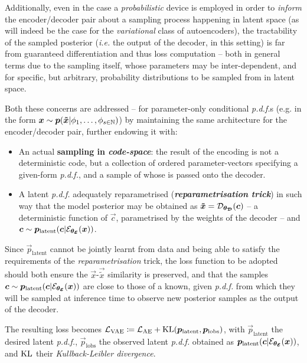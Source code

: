 Additionally, even in the case a \textit{probabilistic} device is employed in order to \textit{inform} the encoder/decoder pair about a sampling process happening in latent space (as will indeed be the case for the \textit{variational} class of autoencoders), the tractability of the sampled posterior (\textit{i.e.} the output of the decoder, in this setting) is far from guaranteed \wrt differentiation and thus loss computation -- both in general terms due to the sampling itself, whose parameters may be inter-dependent, and for specific, but arbitrary, probability distributions to be sampled from in latent space.

Both these concerns are addressed -- for parameter-only conditional \textit{p.d.f.}s (e.g. in the form $\bm{x} \sim \bm{p}(\bm{\tilde{x}} | \phi_1, \dots, \phi_{s\in\mathbb{N}})$) by maintaining the same architecture for the encoder/decoder pair, further endowing it with:
\begin{itemize}
    \item An actual \textbf{sampling in \textit{code-space}}: the result of the encoding is not a deterministic code, but a collection of ordered parameter-vectors specifying a given-form \textit{p.d.f.}, and a sample of whose is passed onto the decoder.
    \item A latent \textit{p.d.f.} adequately reparametrised (\textbf{\textit{reparametrisation trick}}) in such way that the model posterior may be obtained as $\bm{\tilde{x}} = \mathcal{D}_{\bm{\theta_{\mathcal{D}}}}(\bm{c})$ -- a deterministic function of $\vec{c}$, parametrised by the weights of the decoder -- and $\bm{c} \sim \bm{p}_{\text{latent}}(\bm{c}| \mathcal{E}_{\bm{\theta_{\mathcal{E}}}}(\bm{x}))$.
\end{itemize}

Since $\vec{p}_{\text{latent}}$ cannot be jointly learnt from data and being able to satisfy the requirements of the \textit{reparametrisation} trick, the loss function to be adopted should both ensure the $\vec{x}$-$\vec{\tilde{x}}$ similarity is preserved, and that the samples $\bm{c} \sim \bm{p}_{\text{latent}}(\bm{c}| \mathcal{E}_{\bm{\theta_{\mathcal{E}}}}(\bm{x}))$ are close to those of a known, given \textit{p.d.f.} from which they will be sampled at inference time to observe new posterior samples as the output of the decoder.

The resulting loss becomes $\mathcal{L}_{\text{VAE}} \coloneqq \mathcal{L}_{\text{AE}} + \operatorname*{\text{KL}}(\bm{p}_{\text{latent}},\bm{p}_{\text{lobs}})$, with $\vec{p}_{\text{latent}}$ the desired latent \textit{p.d.f.}, $\vec{p}_{\text{lobs}}$ the observed latent \textit{p.d.f.} obtained as $\bm{p}_{\text{latent}}(\bm{c}| \mathcal{E}_{\bm{\theta_{\mathcal{E}}}}(\bm{x}))$, and $\operatorname*{\text{KL}}$ their \textit{Kullback-Leibler divergence}.

